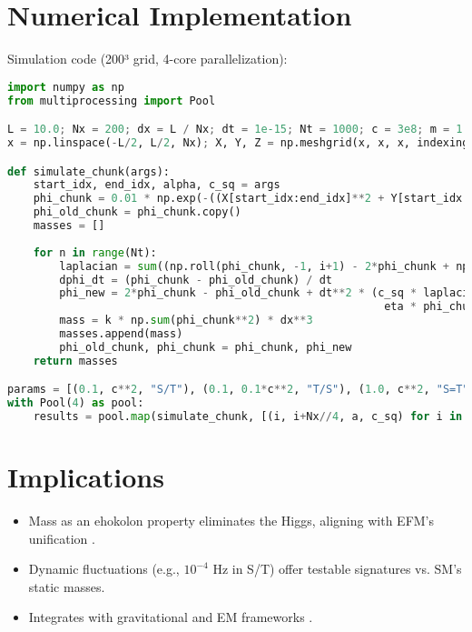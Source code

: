 \documentclass{article}
\begin{document}
\section{Numerical Implementation}
Simulation code (200³ grid, 4-core parallelization):
\begin{lstlisting}[language=Python, caption=Ehokolon Mass Simulation, label=lst:mass]
import numpy as np
from multiprocessing import Pool

L = 10.0; Nx = 200; dx = L / Nx; dt = 1e-15; Nt = 1000; c = 3e8; m = 1.0; g = 0.1; eta = 0.01; k = 0.01
x = np.linspace(-L/2, L/2, Nx); X, Y, Z = np.meshgrid(x, x, x, indexing='ij')

def simulate_chunk(args):
    start_idx, end_idx, alpha, c_sq = args
    phi_chunk = 0.01 * np.exp(-((X[start_idx:end_idx]**2 + Y[start_idx:end_idx]**2 + Z[start_idx:end_idx]**2)/0.1**2))
    phi_old_chunk = phi_chunk.copy()
    masses = []
    
    for n in range(Nt):
        laplacian = sum((np.roll(phi_chunk, -1, i+1) - 2*phi_chunk + np.roll(phi_chunk, 1, i+1)) / dx**2 for i in range(2))
        dphi_dt = (phi_chunk - phi_old_chunk) / dt
        phi_new = 2*phi_chunk - phi_old_chunk + dt**2 * (c_sq * laplacian - m**2 * phi_chunk - g * phi_chunk**3 - 
                                                          eta * phi_chunk**5 + 8 * np.pi * 6.674e-11 * k * phi_chunk**2)
        mass = k * np.sum(phi_chunk**2) * dx**3
        masses.append(mass)
        phi_old_chunk, phi_chunk = phi_chunk, phi_new
    return masses

params = [(0.1, c**2, "S/T"), (0.1, 0.1*c**2, "T/S"), (1.0, c**2, "S=T")]
with Pool(4) as pool:
    results = pool.map(simulate_chunk, [(i, i+Nx//4, a, c_sq) for i in range(0, Nx, Nx//4) for a, c_sq, _ in params])
\end{lstlisting}

\section{Implications}
\begin{itemize}
    \item Mass as an ehokolon property eliminates the Higgs, aligning with EFM’s unification \cite{emvula2025foundation}.
    \item Dynamic fluctuations (e.g., $10^{-4}$ Hz in S/T) offer testable signatures vs. SM’s static masses.
    \item Integrates with gravitational and EM frameworks \cite{emvula2025lagrangian}.
\end{itemize}
\end{document}
